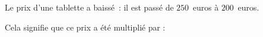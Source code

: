 
Le prix d'une tablette a baissé~: il est passé de $250$~euros à $200$~euros.

\smallskip

Cela signifie que ce prix a été multiplié par :

\smallskip

